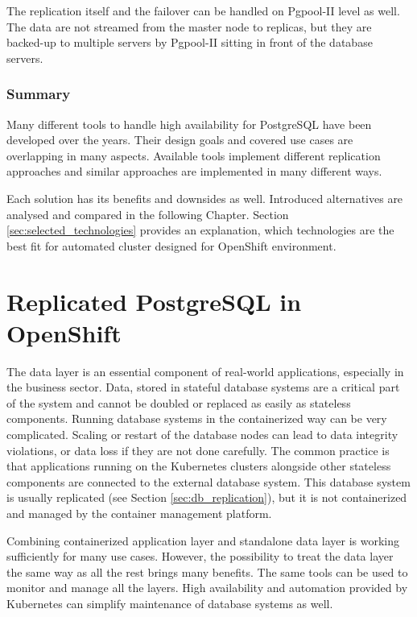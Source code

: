\documentclass[
  digital, %
  twoside, %
  table,   %
  nolof,   %
  nolot,   %
]{fithesis3}
\begin{document}
The replication itself and the failover can be handled on Pgpool-II level as well. The data are not streamed from the master node to replicas, but they are backed-up to multiple servers by Pgpool-II sitting in front of the database servers.

\subsection{Summary}
Many different tools to handle high availability for PostgreSQL have been developed over the years. Their design goals and covered use cases are overlapping in many aspects. Available tools implement different replication approaches and similar approaches are implemented in many different ways.

Each solution has its benefits and downsides as well. Introduced alternatives are analysed and compared in the following Chapter. Section \ref{sec:selected_technologies} provides an explanation, which technologies are the best fit for automated cluster designed for OpenShift environment.


\chapter{Replicated PostgreSQL in OpenShift} \label{chap:pg_in_openshift}
The data layer is an essential component of real-world applications, especially in the business sector. Data, stored in stateful database systems are a critical part of the system and cannot be doubled or replaced as easily as stateless components. Running database systems in the containerized way can be very complicated. Scaling or restart of the database nodes can lead to data integrity violations, or data loss if they are not done carefully. The common practice is that applications running on the Kubernetes clusters alongside other stateless components are connected to the external database system. This database system is usually replicated (see Section \ref{sec:db_replication}), but it is not containerized and managed by the container management platform.

Combining containerized application layer and standalone data layer is working sufficiently for many use cases. However, the possibility to treat the data layer the same way as all the rest brings many benefits. The same tools can be used to monitor and manage all the layers. High availability and automation provided by Kubernetes can simplify maintenance of database systems as well.
\end{document}
